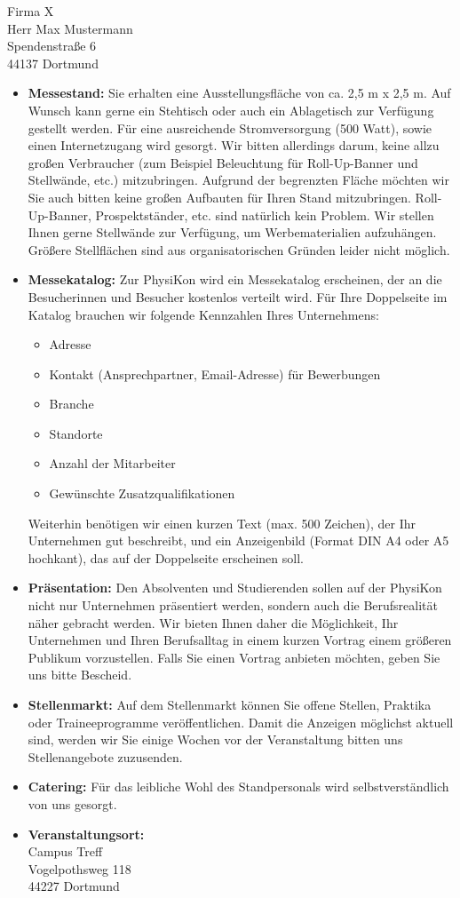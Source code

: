 \documentclass[
  pepbrief,
  fontsize=12pt,
  paper=a4,
  DIV=14,
  parskip=half,
  backaddress=false,
]{scrlttr2}
\begin{document}
\begin{letter}{%
  Firma X\\
  Herr Max Mustermann\\
  Spendenstraße 6\\
  44137 Dortmund%
}
\begin{itemize}
  \item \textbf{Messestand:} Sie erhalten eine Ausstellungsfläche von ca. 2,5 m x 2,5 m.
    Auf Wunsch kann gerne ein Stehtisch oder auch ein Ablagetisch zur Verfügung gestellt werden.
    Für eine ausreichende Stromversorgung (500 Watt), sowie einen Internetzugang wird gesorgt.
    Wir bitten allerdings darum, keine allzu großen Verbraucher (zum Beispiel Beleuchtung für Roll-Up-Banner und Stellwände, etc.) mitzubringen.
    Aufgrund der begrenzten Fläche möchten wir Sie auch bitten keine großen Aufbauten für Ihren Stand mitzubringen.
    Roll-Up-Banner, Prospektständer, etc. sind natürlich kein Problem.
    Wir stellen Ihnen gerne Stellwände zur Verfügung, um Werbematerialien aufzuhängen.
    Größere Stellflächen sind aus organisatorischen Gründen leider nicht möglich.
    \item \textbf{Messekatalog:} Zur PhysiKon wird ein Messekatalog erscheinen, der an die Besucherinnen und Besucher kostenlos verteilt wird.
    Für Ihre Doppelseite im Katalog brauchen wir folgende Kennzahlen Ihres Unternehmens:
    \begin{itemize}
      \item Adresse
      \item Kontakt (Ansprechpartner, Email-Adresse) für Bewerbungen
      \item Branche
      \item Standorte
      \item Anzahl der Mitarbeiter
      \item Gewünschte Zusatzqualifikationen
    \end{itemize}
    Weiterhin benötigen wir einen kurzen Text (max. 500 Zeichen), der Ihr Unternehmen gut beschreibt, und ein Anzeigenbild (Format DIN A4 oder A5 hochkant), das auf der Doppelseite erscheinen soll.
    \item \textbf{Präsentation:} Den Absolventen und Studierenden sollen auf der PhysiKon nicht nur Unternehmen präsentiert werden, sondern auch die Berufsrealität näher gebracht werden.
    Wir bieten Ihnen daher die Möglichkeit, Ihr Unternehmen und Ihren Berufsalltag in einem kurzen Vortrag einem größeren Publikum vorzustellen.
    Falls Sie einen Vortrag anbieten möchten, geben Sie uns bitte Bescheid.
    \item \textbf{Stellenmarkt:} Auf dem Stellenmarkt können Sie offene Stellen, Praktika oder Traineeprogramme veröffentlichen. Damit die Anzeigen möglichst aktuell sind,
    werden wir Sie einige Wochen vor der Veranstaltung bitten uns Stellenangebote zuzusenden.
    \item \textbf{Catering:} Für das leibliche Wohl des Standpersonals wird selbstverständlich von uns gesorgt.
    \item \textbf{Veranstaltungsort:}
    \vspace{3mm}\\
    Campus Treff\\
    Vogelpothsweg 118\\
    44227 Dortmund
\end{itemize}


\end{letter}
\end{document}

